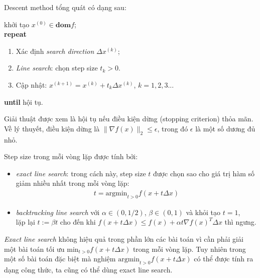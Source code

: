 \documentclass{book}
\begin{document}
Descent method tổng quát có dạng sau:
\begin{algorithm}[H]
khởi tạo $x^{(0)} \in \mathbf{dom}f$;\\
\textbf{repeat} 
\begin{enumerate}
\item Xác định \emph{search direction} $\Delta x^{(k)}$;
\item \emph{Line search}: chọn step size $t_k >0$.
\item Cập nhật: $x^{(k+1)} = x^{(k)} + t_k \Delta x^{(k)}$, $k=1,2,3...$
\end{enumerate}
\textbf{until} hội tụ. 
\caption{Descent method dạng tổng quát.}
\label{alg:descent}
\end{algorithm}
Giải thuật được xem là hội tụ nếu điều kiện dừng (stopping criterion) thỏa mãn. Về lý thuyết, điều kiện dừng là $\|\nabla f(x)\|_2 \leq \epsilon$, trong đó $\epsilon$ là một số dương đủ nhỏ.

Step size trong mỗi vòng lặp được tính bởi:
\begin{itemize}
\item \emph{exact line search}: trong cách này, step size $t$ được chọn sao cho giá trị hàm số giảm nhiều nhất trong mỗi vòng lặp:
\begin{align*}
t = \mathrm{argmin}_{t>0} f(x + t \Delta x)
\end{align*}

\item \emph{backtracking line search} với $\alpha \in (0, 1/2)$, $\beta \in (0, 1)$ và khỏi tạo $t = 1$,\\
lặp lại $t:= \beta t$ cho đến khi $f(x + t \Delta x)  \leq f(x) + \alpha t \nabla f(x)^T \Delta x$ thì ngưng.
\end{itemize}
\emph{Exact line search} không hiệu quả trong phần lớn các bài toán vì cần phải giải một bài toán tối ưu $\mathrm{min}_{t>0} f(x + t \Delta x)$ trong mỗi vòng lặp. 
Tuy nhiên trong một số bài toán đặc biệt mà nghiệm $\mathrm{argmin}_{t>0} f(x + t \Delta x)$ có thể được tính ra dạng công thức, ta cũng có thể dùng exact line search.
\end{document}
